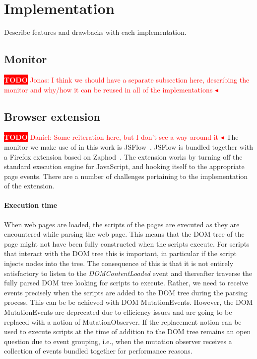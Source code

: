 \documentclass{llncs}
\newcommand{\todo}[1]{\colorbox{red}{\textcolor{white}{\sffamily\bfseries\scriptsize TODO}} \textcolor{red}{#1} \textcolor{red}{$\blacktriangleleft$}}
\begin{document}
\section{Implementation}
\label{sec:impl}

Describe features and drawbacks with each implementation.

\subsection{Monitor}
\todo{Jonas: I think we should have a separate subsection here, describing the monitor and why/how it can be reused in all of the implementations}


\subsection{Browser extension}
%
\todo{Daniel: Some reiteration here, but I don't see a way around it} The
monitor we make use of in this work is JSFlow~\cite{}. JSFlow is bundled
together with a Firefox extension based on Zaphod~\cite{Zaphod}. The extension
works by turning off the standard execution engine for JavaScript, and hooking
itself to the appropriate page events. There are a number of challenges
pertaining to the implementation of the extension.

\paragraph{Execution time}

When web pages are loaded, the scripts of the pages are executed as they are
encountered while parsing the web page. This means that the DOM tree of the
page might not have been fully constructed when the scripts execute.  For
scripts that interact with the DOM tree this is important, in particular if the
script injects nodes into the tree. The consequence of this is that it is not
entirely satisfactory to listen to the \emph{DOMContentLoaded} event and
thereafter traverse the fully parsed DOM tree looking for scripts to execute.
Rather, we need to receive events precisely when the scripts are added to the
DOM tree during the parsing process. This can be be achieved with DOM
MutationEvents. However, the DOM MutationEvents are deprecated due to
efficiency issues and are going to be replaced with a notion of
MutationObserver.  If the replacement notion can be used to execute scripts at
the time of addition to the DOM tree remains an open question due to event
grouping, i.e., when the mutation observer receives a collection of events
bundled together for performance reasons. 
\end{document}
